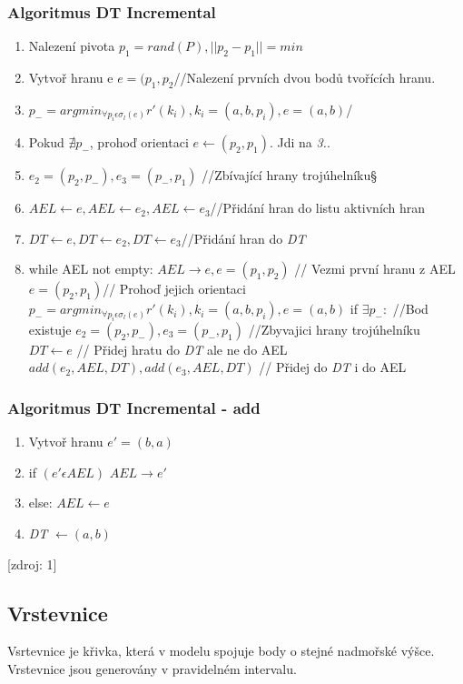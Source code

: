\documentclass[a4paper, 12pt]{article}
\begin{document}
\subsubsection{Algoritmus DT Incremental}
\begin{enumerate}
\item Nalezení pivota $p_1 = rand(P), ||p_2 - p_1|| = min$
\item Vytvoř hranu e $e = (p_1, p_2 $//Nalezení prvních dvou bodů tvořících hranu. 
\item $p_{-} =arg min_{\forall p_i\epsilon \sigma_{l}(e)} r'(k_i), k_i = (a,b,p_i), e = (a,b)$/
\item Pokud $\nexists p_{-}$, prohoď orientaci $e \leftarrow (p_2,p_1)$. Jdi na \textit{3.}.
\item $e_2 = (p_2, p_{-}), e_3 = (p_{-}, p_1)$ //Zbívající hrany trojúhelníku§
\item $AEL \leftarrow e, AEL \leftarrow e_2, AEL \leftarrow e_3$//Přidání hran do listu aktivních hran
\item $\textit{DT} \leftarrow e, \textit{DT} \leftarrow e_2, \textit{DT} \leftarrow e_3$//Přidání hran do \textit{DT}
\item while AEL not empty:
\subitem $AEL \rightarrow e, e = (p_1,p_2)$ // Vezmi první hranu z AEL
\subitem $e = (p_2, p_1)$// Prohoď jejich orientaci
\subitem $p_{-} =arg min_{\forall p_i\epsilon \sigma_{l}(e)} r'(k_i), k_i = (a,b,p_i), e = (a,b)$
\subitem if $\exists p_{-}:$ //Bod existuje
\subsubitem $e_2 = (p_2, p_{-}), e_3 = (p_{-},p_1)$ //Zbyvajici hrany trojúhelníku
\subsubitem $\textit{DT} \leftarrow e$ // Přidej hratu do \textit{DT} ale ne do AEL
\subsubitem $add(e_2, AEL, \textit{DT}), add(e_3, AEL, \textit{DT})$ // Přidej do \textit{DT} i do AEL
\end{enumerate}

\subsubsection{Algoritmus DT Incremental - add}
\begin{enumerate}
\item Vytvoř hranu $e' = (b,a)$
\item if $(e' \epsilon AEL)$
\subitem $AEL \rightarrow e'$
\item else:
\subitem $AEL \leftarrow e$
\item \textit{DT} $\leftarrow (a,b)$
\end{enumerate}[zdroj: 1]

\newpage
\subsection{Vrstevnice}
Vsrtevnice je křivka, která v modelu spojuje body o stejné nadmořské výšce. Vrstevnice jsou generovány v pravidelném intervalu.
\end{document}
